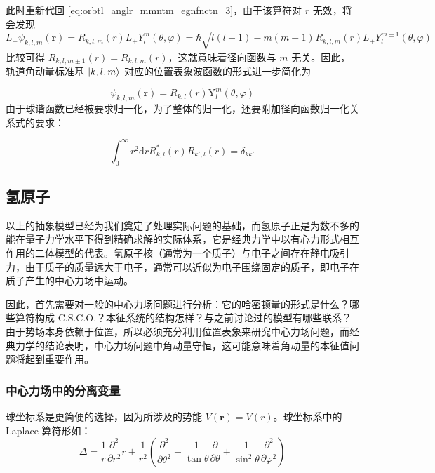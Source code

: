 \documentclass[cn,10pt,math=newtx,citestyle=gb7714-2015,bibstyle=gb7714-2015]{elegantbook}
\def\bm{\boldsymbol}
\def\mr{\mathrm}
\def\d{\mathrm d}
\def\vphi{\varphi}
\begin{document}
此时重新代回 \ref{eq:orbtl_anglr_mmntm_egnfnctn_3}，由于该算符对 $r$ 无效，将会发现
\begin{equation}
    L_\pm\psi_{k,l,m}(\bm r)=R_{k,l,m}(r)L_\pm Y_l^m(\theta,\vphi)=\hbar\sqrt{l(l+1)-m(m\pm 1)}R_{k,l,m}(r)L_\pm Y_l^{m\pm 1}(\theta,\vphi)
\end{equation}
比较可得 $R_{k,l,m\pm 1}(r)=R_{k,l,m}(r)$，这就意味着径向函数与 $m$ 无关。因此，轨道角动量标准基 $\ket{k,l,m}$ 对应的位置表象波函数的形式进一步简化为

\begin{equation}\label{eq:orbtl_anglr_mmntm_wv_fnctn}
    \psi_{k,l,m}(\bm r)=R_{k,l}(r)\mr Y_l^m(\theta,\vphi)
\end{equation}
由于球谐函数已经被要求归一化，为了整体的归一化，还要附加径向函数归一化关系式的要求：

\begin{equation}
    \int_0^{\infty}r^2\d r R_{k,l}^*(r)R_{k',l}(r)=\delta_{kk'}
\end{equation}

\subsection{氢原子}
以上的抽象模型已经为我们奠定了处理实际问题的基础，而氢原子正是为数不多的能在量子力学水平下得到精确求解的实际体系，它是经典力学中以有心力形式相互作用的二体模型的代表。氢原子核（通常为一个质子）与电子之间存在静电吸引力，由于质子的质量远大于电子，通常可以近似为电子围绕固定的质子，即电子在质子产生的中心力场中运动。

因此，首先需要对一般的中心力场问题进行分析：它的哈密顿量的形式是什么？哪些算符构成 C.S.C.O.？本征系统的结构怎样？与之前讨论过的模型有哪些联系？由于势场本身依赖于位置，所以必须充分利用位置表象来研究中心力场问题，而经典力学的结论表明，中心力场问题中角动量守恒，这可能意味着角动量的本征值问题将起到重要作用。

\subsubsection{中心力场中的分离变量}
球坐标系是更简便的选择，因为所涉及的势能 $V(\bm r)= V(r)$。球坐标系中的 Laplace 算符形如：
\begin{equation}\label{eq:sphrcl_crdnt_lplc}
    \Delta = \frac 1 r\frac{\partial^2}{\partial r^2}r+\frac 1{r^2}\left(\frac{\partial^2}{\partial\theta^2}+\frac 1{\tan\theta}\frac{\partial}{\partial\theta}+\frac 1{\sin^2\theta}\frac{\partial^2}{\partial\vphi^2}\right)
\end{equation}
\end{document}
